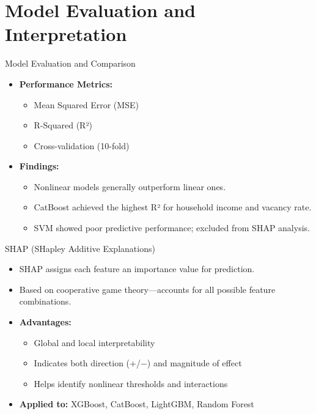 \documentclass{beamer}
\begin{document}
\section{Model Evaluation and Interpretation}
\begin{frame}{Model Evaluation and Comparison}
    \begin{itemize}
        \item \textbf{Performance Metrics:}
            \begin{itemize}
                \item Mean Squared Error (MSE)
                \item R-Squared (R²)
                \item Cross-validation (10-fold)
            \end{itemize}
        \item \textbf{Findings:}
            \begin{itemize}
                \item Nonlinear models generally outperform linear ones.
                \item CatBoost achieved the highest R² for household income and vacancy rate.
                \item SVM showed poor predictive performance; excluded from SHAP analysis.
            \end{itemize}
    \end{itemize}
\end{frame}

\begin{frame}{SHAP (SHapley Additive Explanations)}
    \begin{itemize}
        \item SHAP assigns each feature an importance value for prediction.
        \item Based on cooperative game theory—accounts for all possible feature combinations.
        \item \textbf{Advantages:}
            \begin{itemize}
                \item Global and local interpretability
                \item Indicates both direction (+/−) and magnitude of effect
                \item Helps identify nonlinear thresholds and interactions
            \end{itemize}
        \item \textbf{Applied to:} XGBoost, CatBoost, LightGBM, Random Forest
    \end{itemize}
\end{frame}


    
\end{document}
